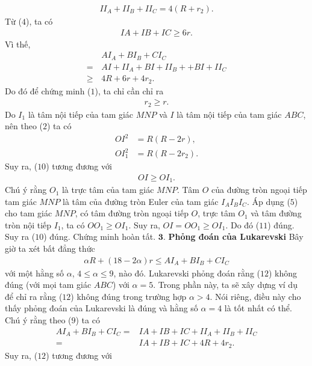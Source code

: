 \begin{multicols}{2}
	\begin{align*}
		II_A+II_B+II_C=4(R+r_2). \tag{$9$}
	\end{align*}
	Từ ($4$), ta có 
	\begin{align*}
		IA+IB+IC\ge 6r.
	\end{align*}
	Vì thế,
	\begin{align*}
		&A I_A + B I_B + C I_C \\
		= \,&AI + II_A+ BI + II_B+ + BI +II_C\\
		\ge \,&4R + 6r+ 4r_2.
	\end{align*}
	Do đó để chứng minh ($1$), ta chỉ cần chỉ ra
	\begin{align*}
		r_2\ge r. \tag{$10$}
	\end{align*}
	Do $I_1$ là tâm nội tiếp của tam giác $MNP$ và $I$ là tâm nội tiếp của tam giác $ABC$, nên theo ($2$) ta có
	\begin{align*}
		OI^2&=R(R-2r),\\
		OI_1^2&=R(R-2r_2).
	\end{align*}
	Suy ra, ($10$) tương đương với 
	\begin{align*}
		OI\ge OI_1. \tag{$11$}
	\end{align*}
	Chú ý rằng $O_1$ là trực tâm của tam giác $MNP$. Tâm $O$ của đường tròn ngoại tiếp tam giác $MNP$ là tâm của đường tròn Euler của tam giác $I_AI_BI_C$. Áp dụng ($5$) cho tam giác $MNP$,  có tâm đường tròn ngoại tiếp $O$, trực tâm $O_1$ và tâm đường tròn nội tiếp $I_1$, ta có $OO_1\ge OI_1$. Suy ra, $OI=OO_1\ge OI_1$. Do đó ($11$) đúng. Suy ra ($10$) đúng. Chứng minh hoàn tất.
	\vskip 0.05cm
	$\pmb{3.}$ \textbf{\color{hoccungpi}Phỏng đoán của Lukarevski}
	\vskip 0.05cm
	Bây giờ ta xét bất đẳng thức
	\begin{align*}
		\alpha R\!+\!(18\!-\!2\alpha)r\!\le\! AI_A\!+\!BI_B\!+\!CI_C \tag{$12$}
	\end{align*}
	với một hằng số $\alpha$, $4\le \alpha\le 9$, nào đó. Lukarevski phỏng đoán rằng ($12$) không đúng (với mọi tam giác $ABC$) với $\alpha=5$. Trong phần này, ta sẽ xây dựng ví dụ để chỉ ra rằng ($12$) không đúng trong trường hợp $\alpha>4$. Nói riêng, điều này cho thấy phỏng đoán của Lukarevski là đúng và hằng số $\alpha=4$ là tốt nhất có thể.
	\vskip 0.05cm
	Chú ý rằng theo ($9$) ta có 
	\begin{align*}
		AI_A\!+\!BI_B\!+\!CI_C\!=\!&IA\!+\!IB\!+\!IC\!+\!II_A\!+\!II_B\!+\!II_C\\
		=&IA\!+\!IB\!+\!IC\!+\!4R\!+\!4r_2.
	\end{align*}
	Suy ra, ($12$) tương đương với

\end{multicols}
